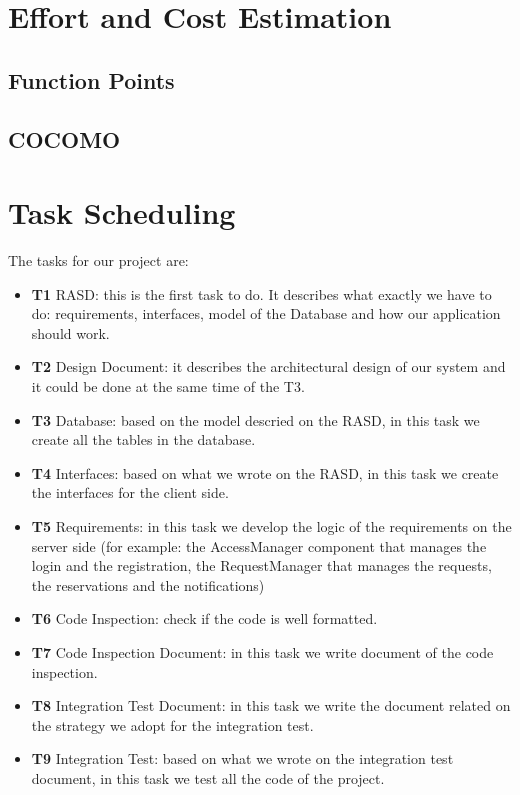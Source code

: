 \documentclass[18pt,oneside,a4paper, titlepage]{article}
\begin{document}
\newpage
\section{Effort and Cost Estimation}

	\subsection{Function Points}
	\subsection{COCOMO}
	
\newpage
\section{Task Scheduling}
	The tasks for our project are:
	\begin{itemize}
		\item \textbf{T1} RASD: this is the first task to do. It describes what exactly we have to do: requirements, interfaces, model of the Database and how our application should work.
		\item \textbf{T2} Design Document: it describes the architectural design of our system and it could be done at the same time of the T3.
		\item \textbf{T3} Database: based on the model descried on the RASD, in this task we create all the tables in the database.
		\item \textbf{T4} Interfaces: based on what we wrote on the RASD, in this task we create the interfaces for the client side.
		\item \textbf{T5} Requirements: in this task we develop the logic of the requirements on the server side (for example: the AccessManager component that manages the login and the registration, the RequestManager that manages the requests, the reservations and the notifications)
		\item \textbf{T6} Code Inspection: check if the code is well formatted.
		\item \textbf{T7} Code Inspection Document: in this task we write document of the code inspection.
		\item \textbf{T8} Integration Test Document: in this task we write the document related on the strategy we adopt for the integration test.
		\item \textbf{T9} Integration Test: based on what we wrote on the integration test document, in this task we test all the code of the project.
	\end{itemize}
\end{document}
